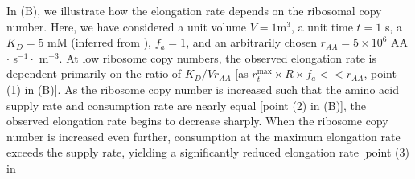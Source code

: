 In (B), we illustrate how the elongation rate depends
on the ribosomal copy number. Here, we have considered a unit volume $V =
1$\textmu m$^3$, a unit time $t = 1$ s, a $K_D = 5$ mM (inferred from
\cite{bennett2009}), $f_a = 1$, and an arbitrarily chosen $r_{AA} = 5\times 10^6$ AA
$\cdot$ s$^{-1} \cdot$ \textmu m$^{-3}$. At low ribosome copy numbers, the
observed elongation rate is dependent primarily on the ratio of $K_D / Vr_{AA}$
[as $r_t^{\text{max}} \times R \times f_a << r_{AA}$, point (1) in
(B)]. As the ribosome copy number is increased such
that the amino acid supply rate and  consumption rate are nearly equal [point
(2) in (B)], the observed elongation rate begins to
decrease sharply. When the ribosome copy number is increased even further,
consumption at the maximum elongation rate exceeds the supply rate, yielding  a
significantly reduced elongation rate [point (3) in
